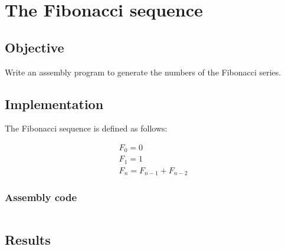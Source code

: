 \section{The Fibonacci sequence}

\subsection{Objective}
Write an assembly program to generate the numbers of the Fibonacci series.


\subsection{Implementation}

The Fibonacci sequence is defined as follows:

\begin{align*}
    F_0 = 0 \\
    F_1 = 1 \\
    F_n = F_{n-1} + F_{n-2}
\end{align*}

\subsubsection{Assembly code}

\inputminted[linenos, frame=single, breaklines]{asm}{./code/fib.asm}

\subsection{Results}

\pagebreak